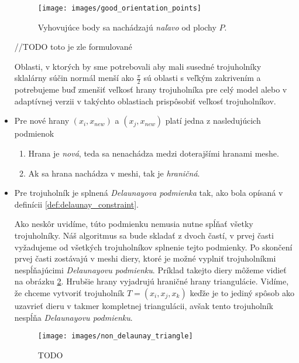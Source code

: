 \begin{itemize}
{        \begin{figure}
            \centerline{\texttt{[image: images/good\_orientation\_points]}}
            \caption[]{Vyhovujúce body sa nachádzajú \textit{naľavo} od plochy $P$.}
            \label{obr:good_orientation_points}
        \end{figure}


        //TODO toto je zle formulované

        Oblasti, v ktorých by sme potrebovali aby mali susedné trojuholníky sklalárny súčin normál menší ako 
        $\frac{\pi}{2}$ sú oblasti s veľkým zakrivením a potrebujeme buď zmenšiť veľkosť hrany trojuholníka
        pre celý model alebo v adaptívnej verzii v takýchto oblastiach prispôsobiť veľkosť trojuholníkov. 
    }

     \item{
         Pre nové hrany $(x_i, x_{new})$ a $(x_j, x_{new})$ platí jedna z nasledujúcich podmienok
         \begin{enumerate}
            \item {
                Hrana je \textit{nová}, teda sa nenachádza medzi doterajšími hranami meshe. 
            }
            \item {
                Ak sa hrana nachádza v meshi, tak je \textit{hraničná}.
            }
         \end{enumerate}
     }

     \item{
         Pre trojuholník je splnená \textit{Delaunayova podmienka} tak, ako bola opísaná v 
         definícii \ref{def:delaunay_constraint}.

        Ako neskôr uvidíme, túto podmienku nemusia nutne spĺňať všetky trojuholníky. Náš algoritmus sa bude 
        skladať z dvoch častí, v prvej časti vyžadujeme od všetkých trojuholníkov splnenie tejto podmienky.
        Po skončení prvej časti zostávajú v meshi diery, ktoré je možné vyplniť trojuholníkmi nespĺňajúcimi 
        \textit{Delaunayovu podmienku}. Príklad takejto diery môžeme vidieť na obrázku 
        \ref{obr:non_delaunay_triangle}. Hrubšie hrany vyjadrujú hraničné hrany triangulácie. 
        Vidíme, že chceme vytvoriť trojuholník $T = (x_i, x_j, x_k)$
        keďže je to jediný spôsob ako uzavrieť dieru v takmer kompletnej triangulácii,
        avšak tento trojuholník nespĺňa \textit{Delaunayovu podmienku}.
     }
    \begin{figure}
        \centerline{\texttt{[image: images/non\_delaunay\_triangle]}}
        \caption[]{TODO}
        \label{obr:non_delaunay_triangle}
    \end{figure}
\end{itemize}

